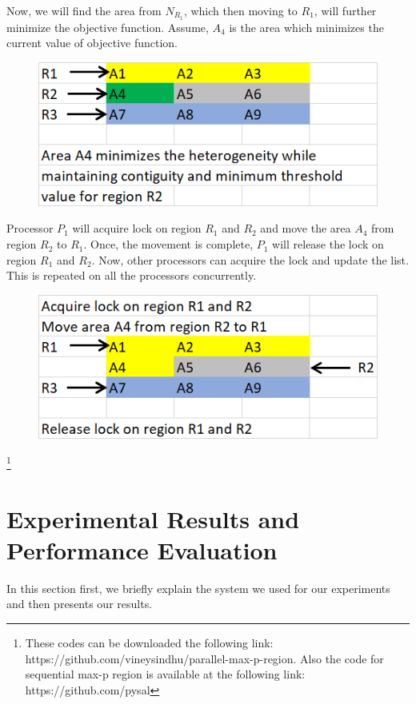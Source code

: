 \documentclass[conference]{IEEEtran}
\begin{document}
Now, we will find the area from $N_{R_1}$, which then moving to $R_1$, will
further minimize the objective function. Assume, $A_4$ is the area which
minimizes the current value of objective function. \\

\begin{figure}[h]
\includegraphics[scale=0.85]{o3.png}
\end{figure}

Processor $P_1$ will acquire lock on region $R_1$ and $R_2$ and move the area $A_4$ from region $R_2$ to
$R_1$. Once, the movement is complete, $P_1$ will release the lock on region $R_1$ and $R_2$. Now, other processors can acquire the lock and update the list. This is repeated on all the processors concurrently. \\

\begin{figure}[h]
\includegraphics[scale=0.85]{o4.png}
\end{figure}

\footnote{These codes can be downloaded the following link: https://github.com/vineysindhu/parallel-max-p-region.
Also the code for sequential max-p region is available at the following link: https://github.com/pysal}

\section{Experimental Results and Performance Evaluation}
In this section first, we briefly explain the system we used for our experiments and then presents our results.
\end{document}
